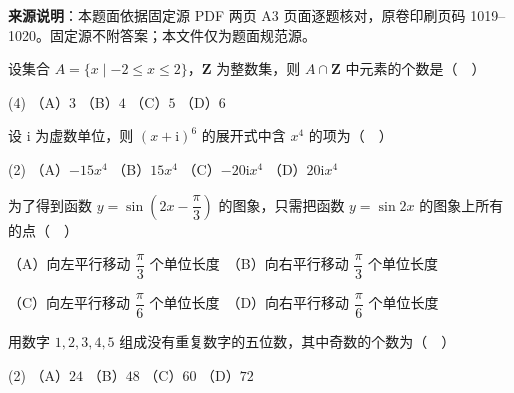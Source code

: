 


\begin{gktip}
\textbf{来源说明}：本题面依据固定源 PDF 两页 A3 页面逐题核对，原卷印刷页码 1019–1020。固定源不附答案；本文件仅为题面规范源。
\end{gktip}


\begin{question}
设集合 \(A=\{x\mid -2\leqslant x\leqslant 2\}\)，\(\mathbf{Z}\) 为整数集，则 \(A\cap\mathbf{Z}\) 中元素的个数是（　）

\begin{gkopts}(4)
\task （A）\(3\)
\task （B）\(4\)
\task （C）\(5\)
\task （D）\(6\)
\end{gkopts}

\end{question}
\begin{question}
设 \(\mathrm{i}\) 为虚数单位，则 \((x+\mathrm{i})^{6}\) 的展开式中含 \(x^{4}\) 的项为（　）

\begin{gkopts}(2)
\task （A）\(-15x^{4}\)
\task （B）\(15x^{4}\)
\task （C）\(-20\mathrm{i}x^{4}\)
\task （D）\(20\mathrm{i}x^{4}\)
\end{gkopts}

\end{question}
\begin{question}
为了得到函数 \(y=\sin\left(2x-\dfrac{\pi}{3}\right)\) 的图象，只需把函数 \(y=\sin 2x\) 的图象上所有的点（　）

（A）向左平行移动 \(\dfrac{\pi}{3}\) 个单位长度　（B）向右平行移动 \(\dfrac{\pi}{3}\) 个单位长度

（C）向左平行移动 \(\dfrac{\pi}{6}\) 个单位长度　（D）向右平行移动 \(\dfrac{\pi}{6}\) 个单位长度

\end{question}
\begin{question}
用数字 \(1,2,3,4,5\) 组成没有重复数字的五位数，其中奇数的个数为（　）

\begin{gkopts}(2)
\task （A）\(24\)
\task （B）\(48\)
\task （C）\(60\)
\task （D）\(72\)
\end{gkopts}

\end{question}
